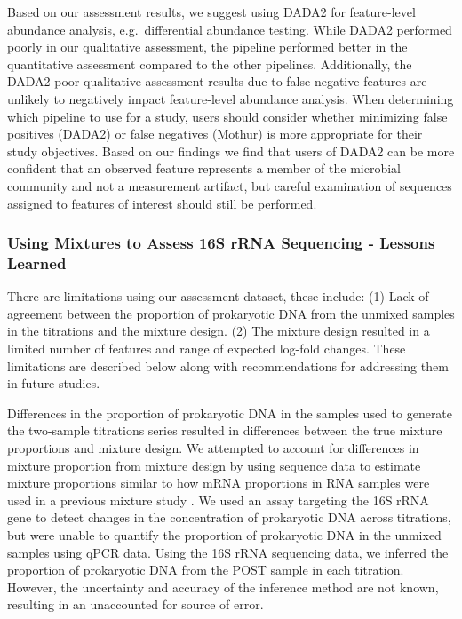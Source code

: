 \documentclass[linenumbers]{bmcart}
\begin{document}
Based on our assessment results, we suggest using DADA2 for
feature-level abundance analysis, e.g.~differential abundance testing.
While DADA2 performed poorly in our qualitative assessment,
the pipeline performed better in the quantitative assessment compared to the other pipelines.
Additionally, the DADA2 poor qualitative assessment results due to
false-negative features are unlikely to negatively impact feature-level abundance analysis.
When determining which pipeline to use for a study, users should consider
whether minimizing false positives (DADA2) or false negatives (Mothur)
is more appropriate for their study objectives.
Based on our findings we find that users of DADA2 can be more
confident that an observed feature represents a member of the
microbial community and not a measurement artifact, but careful examination of sequences assigned to features of interest should still be performed.

\subsubsection*{Using Mixtures to Assess 16S rRNA Sequencing - Lessons Learned}

There are limitations using our assessment dataset, these include:
(1) Lack of agreement between the proportion of prokaryotic DNA from the
unmixed samples in the titrations and the mixture design.
(2) The mixture design resulted in a limited number of features and range of expected log-fold changes.
These limitations are described below along with
recommendations for addressing them in future studies.

Differences in the proportion of prokaryotic DNA in the samples used to
generate the two-sample titrations series resulted in differences
between the true mixture proportions and mixture design. We attempted to
account for differences in mixture proportion from mixture design by
using sequence data to estimate mixture proportions similar to how mRNA
proportions in RNA samples were used in a previous mixture study
\cite{parsons2015using}. We used an assay targeting the 16S rRNA gene
to detect changes in the concentration of prokaryotic DNA across
titrations, but were unable to quantify the proportion of prokaryotic
DNA in the unmixed samples using qPCR data. Using the 16S rRNA sequencing
data, we inferred the proportion of prokaryotic DNA from the POST sample
in each titration. However, the uncertainty and accuracy of the
inference method are not known, resulting in an unaccounted for source of error.
\end{document}
